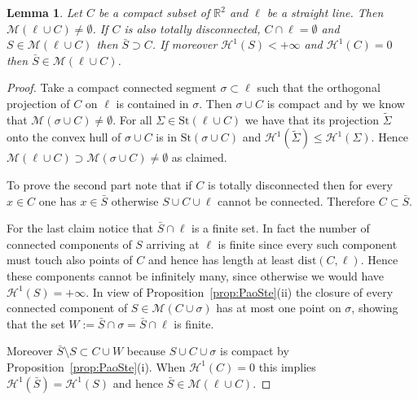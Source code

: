 \documentclass{amsart}
\newcommand{\RR}{\mathbb R}
\renewcommand{\H}{\mathcal H}
\newcommand{\St}{\mathrm{St}}
\newcommand{\M}{\mathcal{M}}
\renewcommand{\H}{\mathcal{H}}
\newcommand{\dist}{\mathrm{dist}}
\newtheorem{lemma}[theorem]{Lemma}
\theoremstyle{definition}
\theoremstyle{remark}
\begin{document}
\begin{lemma}\label{lm:exists}
  Let $C$ be a compact subset of $\RR^2$ and $\ell$ be a straight line.
  Then $\M(\ell\cup C)\neq \emptyset$.
  If $C$ is also totally disconnected, $C\cap \ell=\emptyset$ 
  and $S\in \M(\ell\cup C)$  
  then $\bar S \supset C$.
  If moreover $\H^1(S)<+\infty$ and $\H^1(C)=0$ 
  then $\bar S\in \M(\ell\cup C)$.
\end{lemma}
\begin{proof}
  Take a compact connected segment $\sigma\subset \ell$ such that 
  the orthogonal projection of $C$ on $\ell$ is contained 
  in $\sigma$. 
  Then $\sigma\cup C$ is compact and by 
  \cite{PaoSte12} we know that 
  $\M(\sigma \cup C)\neq \emptyset$.
  For all $\Sigma \in \St(\ell\cup C)$ we have that its projection 
  $\tilde \Sigma$ 
  onto the convex hull of $\sigma\cup C$ is in $\St(\sigma\cup C)$
  and $\H^1(\tilde \Sigma)\le \H^1(\Sigma)$.
  Hence $\M(\ell\cup C)\supset \M(\sigma\cup C)\neq \emptyset$ as claimed.

  To prove the second part note that if $C$ is totally disconnected 
  then for every $x\in C$ one has $x\in \bar S$ otherwise 
  $S\cup C\cup \ell$ cannot be connected. 
  Therefore $C\subset \bar S$. 
  
  For the last claim notice that $\bar S\cap \ell$ is a finite set.
  In fact the number of connected components of $S$ arriving at $\ell$ 
  is finite since every such component must touch also points of $C$ 
  and hence has length at least $\dist(C,\ell)$.  
  Hence these components cannot be infinitely many,
  since otherwise we would have $\H^1(S)=+\infty$.
  In view of Proposition~\ref{prop:PaoSte}(ii) 
  the closure of every connected component 
  of $S\in\M(C\cup \sigma)$ 
  has at most one point on $\sigma$, showing that the set 
  $W:=\bar S\cap \sigma = \bar S \cap \ell$ 
  is finite.

  Moreover $\bar S \setminus S \subset C\cup W$ because 
  $S\cup C\cup \sigma$ is compact by Proposition~\ref{prop:PaoSte}(i).
  When $\H^1(C)=0$ this implies $\H^1(\bar S)=\H^1(S)$ and hence 
  $\bar S\in \M(\ell\cup C)$.
\end{proof}
\end{document}
